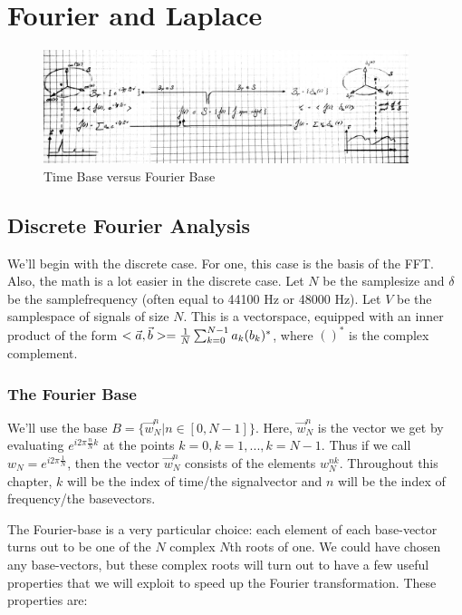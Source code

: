 \section{Fourier and Laplace}

\begin{figure}[H]
  \caption{Time Base versus Fourier Base}
  \centering
    \includegraphics[width=0.95\textwidth]{images/fourier_base.jpg}
\end{figure}


\subsection{Discrete Fourier Analysis}

We'll begin with the discrete case. For one, this case is the basis of the FFT. Also, the math is a lot easier in the discrete case. Let $N$ be the samplesize and $\delta$ be the samplefrequency (often equal to 44100 Hz or 48000 Hz). Let $V$ be the samplespace of signals of size $N$. This is a vectorspace, equipped with an inner product of the form $< \vec{a} , \vec{b} > = \frac{1}{N} \sum_{k=0}^{N-1} a_k (b_k)^*$, where $()^*$ is the complex complement.

\subsubsection{The Fourier Base}




We'll use the base $B = \{ \vec{w}_N^n | n \in [0, N-1]\}$. Here, $\vec{w}_N^n$ is the vector we get by evaluating $e^{i 2\pi \frac{n}{N} k}$ at the points $k=0, k=1, ..., k=N-1$. Thus if we call $w_N = e^{i 2 \pi \frac{1}{N}}$, then the vector $\vec{w}_N^n$ consists of the elements $w_N^{nk}$. Throughout this chapter, $k$ will be the index of time/the signalvector and $n$ will be the index of frequency/the basevectors.

The Fourier-base is a very particular choice: each element of each base-vector turns out to be one of the $N$ complex $N$th roots of one. We could have chosen any base-vectors, but these complex roots will turn out to have a few useful properties that we will exploit to speed up the Fourier transformation. These properties are:

